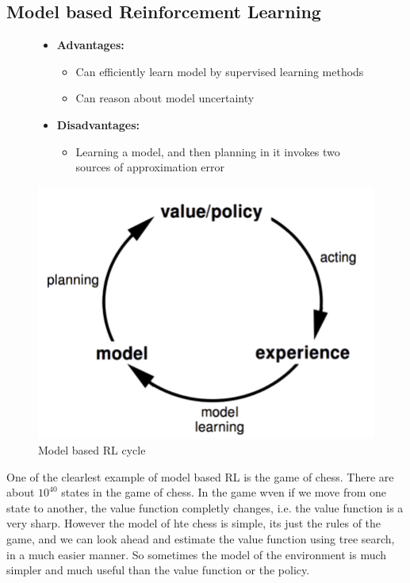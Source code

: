 \subsection{Model based Reinforcement Learning}
\begin{figure}[H]
    \begin{minipage}{0.5\textwidth}
        \begin{itemize}
            \item \textbf{Advantages:}
            \begin{itemize}
                \item Can efficiently learn model by supervised learning methods
                \item Can reason about model uncertainty
            \end{itemize}
            \item \textbf{Disadvantages:}
            \begin{itemize}
                \item Learning a model, and then planning in it invokes two sources of approximation error
            \end{itemize}
        \end{itemize}
    \end{minipage}%
    \begin{minipage}{0.5\textwidth}
      \centering
      \includegraphics[height=0.5\textwidth]{figures/modelrlcycle.png}
      \caption{Model based RL cycle}
        \label{fig:modelrlcycle}
    \end{minipage}
\end{figure}
One of the clearlest example of model based RL is the game of chess. There are about \(10^{40}\) states in the
game of chess. In the game wven if we move from one state to another, the value function completly changes, i.e. the
value function is a very sharp. However the model of hte chess is simple, its just the rules of the game, and we can look
ahead and estimate the value function using tree search, in a much easier manner. 
So sometimes the model of the environment is much simpler and much useful than the value function or the policy.
